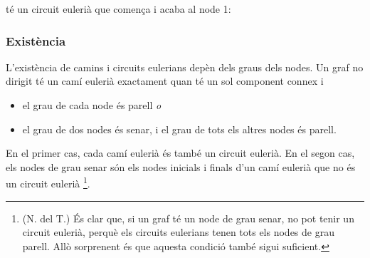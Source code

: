 té un circuit eulerià que comença i acaba al node 1:
\begin{center}
\end{center}


\subsubsection{Existència}

L'existència de camins i circuits eulerians depèn dels graus dels
nodes. Un graf no dirigit té un camí eulerià exactament quan té un sol component
connex i
\begin{itemize}
\item el grau de cada node és parell \emph{o}
\item el grau de dos nodes és senar, i el grau de tots els altres nodes és parell.
\end{itemize}


En el primer cas, cada camí eulerià és també un circuit eulerià. En el
segon cas, els nodes de grau senar són els nodes inicials i finals
d'un camí eulerià que no és un circuit eulerià \footnote{(N. del T.)
És clar que, si un graf té un node de grau senar, no pot tenir un
circuit eulerià, perquè els circuits eulerians tenen tots els nodes de
grau parell. Allò sorprenent és que aquesta condició també sigui
suficient.}.


